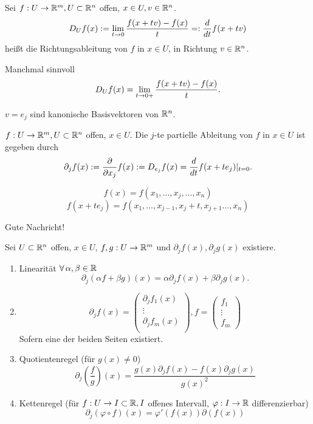 \documentclass[../ana2.tex]{subfiles}
\begin{document}
\begin{defi}[Richtungsableitung]
    Sei \( f:U\rightarrow \mathbb{R}^m, U \subset \mathbb{R}^n \) offen, 
    \( x \in U, v \in \mathbb{R}^n \).
    \[ D_U f(x) := \lim\limits_{t\rightarrow{}0} \frac{f(x + tv) - f(x)}{t} 
    =: \frac{d}{dt} f(x + tv) \]
    heißt die Richtungsableitung von \( f \) in \( x\in U \), 
    in Richtung \( v \in \mathbb{R}^n \).
\end{defi}
\begin{bem}
    Manchmal sinnvoll
    \[ D_U f(x) = \lim\limits_{t\rightarrow{}0+} \frac{f(x + tv) - f(x)}{t}. \]
\end{bem}
\begin{bsp}
    \( v = e_j \) sind kanonische Basisvektoren von \( \mathbb{R}^n \).
\end{bsp}
\begin{defi}
    \( f:U\rightarrow \mathbb{R}^m, U \subset \mathbb{R}^n \) offen, \( x\in U \).
    Die \(j\)-te partielle Ableitung von \(f\) in \(x \in U\) 
    ist gegeben durch
    \[ \partial_j f(x) := \frac{\partial}{\partial x_j} f(x) 
    := D_{e_j} f(x) = \frac{d}{dt} f(x + t e_j) \vert_{t=0}. \]
\end{defi}
\begin{bem}
    \[ f(x) = f(x_1, \ldots, x_j, \ldots, x_n) \]
    \[ f(x+t e_j) = f(x_1, \ldots, x_{j-1}, 
    x_j + t, x_{j+1} \ldots, x_n) \]
\end{bem}
Gute Nachricht!
\begin{lem}
    Sei \( U \subset \mathbb{R}^n \) offen, \( x\in U \), 
    \( f,g:U\rightarrow \mathbb{R}^m \) und 
    \( \partial_j f(x), \partial_j g(x) \) existiere.
    \begin{enumerate}
        \item Linearität \( \forall \alpha, \beta \in \R \)
        \[ \partial_j (\alpha f + \beta g)(x) 
        = \alpha \partial_j f(x) + \beta \partial_j g(x). \]
        \item \[ \partial_j f(x) = \left(\begin{array}{c}
            \partial_j f_1(x) \\
            \vdots \\
            \partial_j f_m(x) \\
        \end{array}\right), 
        f = \left( \begin{array}{c}
            f_1\\
            \vdots \\
            f_m           
        \end{array} \right) \]
        Sofern eine der beiden Seiten existiert.
        \item Quotientenregel (für \( g(x) \neq 0 \))
        \[ \partial_j (\frac{f}{g})(x) 
        = \frac{g(x) \partial_j f(x) - f(x) \partial_j g(x)}{g(x)^2} \]
        \item Kettenregel (für \( f:U\rightarrow I \subset \mathbb{R}, 
        I \) offenes Intervall, 
        \( \varphi:I\rightarrow \mathbb{R} \) differenzierbar)
        \[ \partial_j (\varphi \circ f)(x) 
        = \varphi'(f(x)) \partial(f(x)) \]
    \end{enumerate}
\end{lem}
\end{document}

